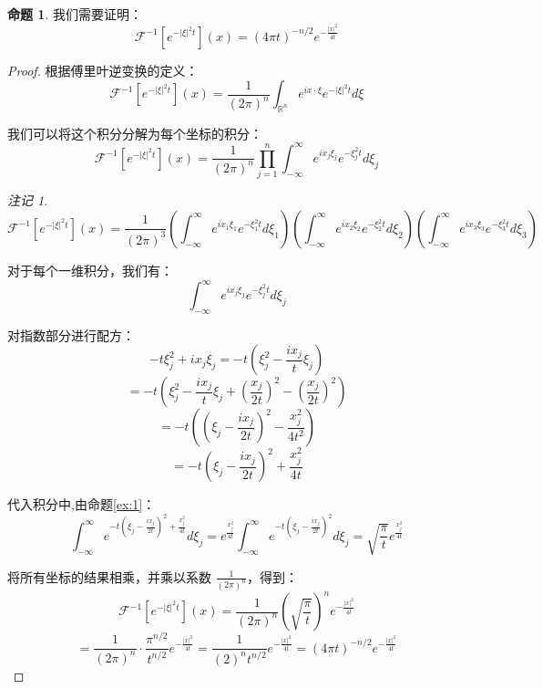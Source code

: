 \documentclass[12pt,a4paper]{article}
\numberwithin{subsection}{section}   %
\numberwithin{subsubsection}{subsection}
\theoremstyle{plain}
\theoremstyle{definition}
\newtheorem{example}{命题}[subsection]  %
\theoremstyle{remark}
\newtheorem{remark}[theorem]{注记}
\theoremstyle{remark}
\begin{document}
	\begin{example}
		我们需要证明：
		\[
		\mathcal{F}^{-1}\left[e^{-|\xi|^2 t}\right](x) = (4\pi t)^{-n/2} e^{-\frac{|x|^2}{4t}}
		\]
	\end{example}
	

	
	\begin{proof}
		
		根据傅里叶逆变换的定义：
		\[
		\mathcal{F}^{-1}\left[e^{-|\xi|^2 t}\right](x) = \frac{1}{(2\pi)^n} \int_{\mathbb{R}^n} e^{i x \cdot \xi} e^{-|\xi|^2 t} d\xi
		\]
		
		我们可以将这个积分分解为每个坐标的积分：
		\[
		\mathcal{F}^{-1}\left[e^{-|\xi|^2 t}\right](x) = \frac{1}{(2\pi)^n} \prod_{j=1}^n \int_{-\infty}^\infty e^{i x_j \xi_j} e^{-\xi_j^2 t} d\xi_j
		\]
		
	\begin{remark}
	\[
	\mathcal{F}^{-1}\left[e^{-|\xi|^{2} t}\right](x)=\frac{1}{(2\pi)^{3}}\left(\int_{-\infty}^{\infty} e^{i x_1 \xi_1} e^{-\xi_1^{2} t} d\xi_1\right)\left(\int_{-\infty}^{\infty} e^{i x_2 \xi_2} e^{-\xi_2^{2} t} d\xi_2\right)\left(\int_{-\infty}^{\infty} e^{i x_3 \xi_3} e^{-\xi_3^{2} t} d\xi_3\right)
	\]
	\end{remark}
		
		
		对于每个一维积分，我们有：
		\[
		\int_{-\infty}^\infty e^{i x_j \xi_j} e^{-\xi_j^2 t} d\xi_j
		\]
		
		对指数部分进行配方：
		\[
		-t \xi_j^2 + i x_j \xi_j = -t \left( \xi_j^2 - \frac{i x_j}{t} \xi_j \right)
		\]
		\[
		= -t \left( \xi_j^2 - \frac{i x_j}{t} \xi_j + \left( \frac{x_j}{2t} \right)^2 - \left( \frac{x_j}{2t} \right)^2 \right)
		\]
		\[
		= -t \left( \left( \xi_j - \frac{i x_j}{2t} \right)^2 - \frac{x_j^2}{4t^2} \right)
		\]
		\[
		= -t \left( \xi_j - \frac{i x_j}{2t} \right)^2 + \frac{x_j^2}{4t}
		\]
		
		代入积分中,由命题\eqref{ex:1}：
		\[
		\int_{-\infty}^\infty e^{-t \left( \xi_j - \frac{i x_j}{2t} \right)^2 + \frac{x_j^2}{4t}} d\xi_j = e^{\frac{x_j^2}{4t}} \int_{-\infty}^\infty e^{-t \left( \xi_j - \frac{i x_j}{2t} \right)^2} d\xi_j= \sqrt{\frac{\pi}{t}} e^{\frac{x_j^2}{4t}}
		\]
	
		
		将所有坐标的结果相乘，并乘以系数 \( \frac{1}{(2\pi)^n} \)，得到：
		\[
		\mathcal{F}^{-1}\left[e^{-|\xi|^2 t}\right](x) = \frac{1}{(2\pi)^n} \left( \sqrt{\frac{\pi}{t}} \right)^n e^{-\frac{|x|^2}{4t}}
		\]
		\[
		= \frac{1}{(2\pi)^n} \cdot \frac{\pi^{n/2}}{t^{n/2}} e^{-\frac{|x|^2}{4t}}= \frac{1}{(2)^n t^{n/2}} e^{-\frac{|x|^2}{4t}}= (4 \pi t)^{-n/2} e^{-\frac{|x|^2}{4t}}
		\]

	\end{proof}
	
\end{document}
